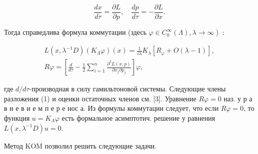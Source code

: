 \documentclass[10pt]{article}
\begin{document}
\[

\frac{d x}{d \tau}=\frac{\partial L}{\partial p}, \quad \frac{d p}{d \tau}=-\frac{\partial L}{\partial x} .

\]



Тогда справедлива формула коммутации (здесь $\left.\varphi \in C_{0}^{\infty}(\Lambda), \lambda \rightarrow \infty\right)$ :



\[

\begin{gathered}

L\left(x, \lambda^{-1} D\right)\left(K_{\Lambda} \varphi\right)(x)=\frac{1}{i \lambda} K_{\lambda}\left[R_{\varphi}+O(\lambda-1)\right], \\

R \varphi=\left[\frac{d}{d \tau}-\frac{1}{2} \sum_{i=1}^{n} \frac{\partial^{2} L(x, p)}{\partial x_{j} \partial p_{j}}\right] \varphi,

\end{gathered}

\]



где $d / d \tau$-производная в силу гамильтоновой системы. Следующие члены разложения (1) и оценки остаточных членов см. [3]. Уравнение $R \varphi=0$ наз. у р а в н е в и е м п е р е нос а. Из формулы коммутации следует, что если $R \varphi=0$, то функция $u=K_{\Lambda} \varphi$ есть формальное асимптотич. решение у равнения $L\left(x, \lambda^{-1} D\right) u=0$.



Метод KOM позволил решить следующие задачи.
\end{document}
